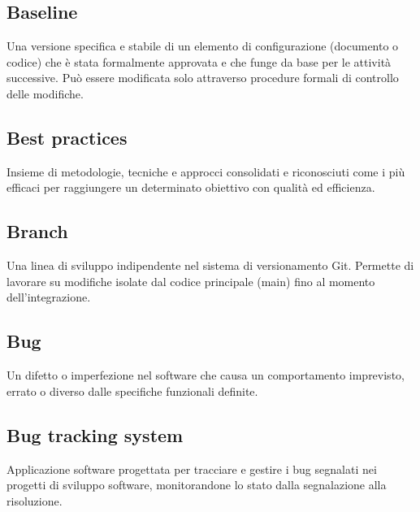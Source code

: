 \documentclass[a4paper, 11pt, oneside]{scrartcl} %
\begin{document}
\subsection*{Baseline}
Una versione specifica e stabile di un elemento di configurazione (documento o codice) che è stata formalmente approvata e che funge da base per le attività successive. Può essere modificata solo attraverso procedure formali di controllo delle modifiche.
\vspace{0.5cm}

\subsection*{Best practices}


Insieme di metodologie, tecniche e approcci consolidati e riconosciuti come i più efficaci per raggiungere un determinato obiettivo con qualità ed efficienza.

\vspace{0.5cm}

\subsection*{Branch}


Una linea di sviluppo indipendente nel sistema di versionamento Git. Permette di lavorare su modifiche isolate dal codice principale (main) fino al momento dell'integrazione.

\vspace{0.5cm}

\subsection*{Bug}
Un difetto o imperfezione nel software che causa un comportamento imprevisto, errato o diverso dalle specifiche funzionali definite.
\vspace{0.5cm}

\subsection*{Bug tracking system}
Applicazione software progettata per tracciare e gestire i bug segnalati nei progetti di sviluppo software, monitorandone lo stato dalla segnalazione alla risoluzione.
\vspace{0.5cm}
\end{document}
